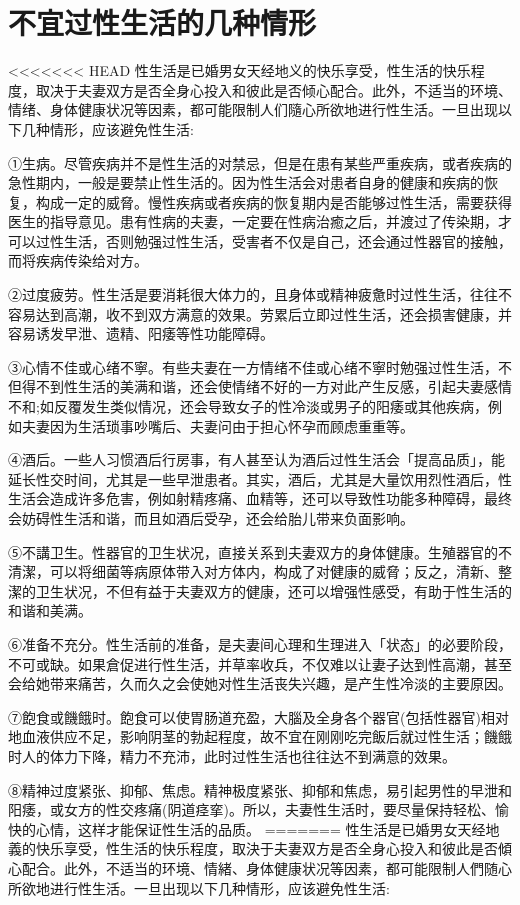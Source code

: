 \documentclass[12pt,UTF8]{ctexbook}
\begin{document}
\section{不宜过性生活的几种情形}

<<<<<<< HEAD
性生活是已婚男女天经地义的快乐享受，性生活的快乐程度，取决于夫妻双方是否全身心投入和彼此是否倾心配合。此外，不适当的环境、情绪、身体健康状况等因素，都可能限制人们隨心所欲地进行性生活。一旦出现以下几种情形，应该避免性生活:

①生病。尽管疾病并不是性生活的对禁忌，但是在患有某些严重疾病，或者疾病的急性期内，一般是要禁止性生活的。因为性生活会对患者自身的健康和疾病的恢复，构成一定的威脅。慢性疾病或者疾病的恢复期内是否能够过性生活，需要获得医生的指导意见。患有性病的夫妻，一定要在性病治癒之后，并渡过了传染期，才可以过性生活，否则勉强过性生活，受害者不仅是自己，还会通过性器官的接触，而将疾病传染给对方。

②过度疲劳。性生活是要消耗很大体力的，且身体或精神疲惫时过性生活，往往不容易达到高潮，收不到双方满意的效果。劳累后立即过性生活，还会损害健康，并容易诱发早泄、遗精、阳痿等性功能障碍。

③心情不佳或心绪不寧。有些夫妻在一方情绪不佳或心绪不寧时勉强过性生活，不但得不到性生活的美满和谐，还会使情绪不好的一方对此产生反感，引起夫妻感情不和;如反覆发生类似情况，还会导致女子的性冷淡或男子的阳痿或其他疾病，例如夫妻因为生活琐事吵嘴后、夫妻问由于担心怀孕而顾虑重重等。

④酒后。一些人习惯酒后行房事，有人甚至认为酒后过性生活会「提高品质」，能延长性交时间，尤其是一些早泄患者。其实，酒后，尤其是大量饮用烈性酒后，性生活会造成许多危害，例如射精疼痛、血精等，还可以导致性功能多种障碍，最终会妨碍性生活和谐，而且如酒后受孕，还会给胎儿带来负面影响。

⑤不講卫生。性器官的卫生状况，直接关系到夫妻双方的身体健康。生殖器官的不清潔，可以将细菌等病原体带入对方体内，构成了对健康的威脅；反之，清新、整潔的卫生状况，不但有益于夫妻双方的健康，还可以增强性感受，有助于性生活的和谐和美满。

⑥准备不充分。性生活前的准备，是夫妻间心理和生理进入「状态」的必要阶段，不可或缺。如果倉促进行性生活，并草率收兵，不仅难以让妻子达到性高潮，甚至会给她带来痛苦，久而久之会使她对性生活丧失兴趣，是产生性冷淡的主要原因。

⑦飽食或饑餓时。飽食可以使胃肠道充盈，大腦及全身各个器官(包括性器官)相对地血液供应不足，影响阴茎的勃起程度，故不宜在刚刚吃完飯后就过性生活；饑餓时人的体力下降，精力不充沛，此时过性生活也往往达不到满意的效果。

⑧精神过度紧张、抑郁、焦虑。精神极度紧张、抑郁和焦虑，易引起男性的早泄和阳痿，或女方的性交疼痛(阴道痉挛)。所以，夫妻性生活时，要尽量保持轻松、愉快的心情，这样才能保证性生活的品质。
=======
性生活是已婚男女天经地義的快乐享受，性生活的快乐程度，取決于夫妻双方是否全身心投入和彼此是否傾心配合。此外，不适当的环境、情緒、身体健康状况等因素，都可能限制人們随心所欲地进行性生活。一旦出现以下几种情形，应该避免性生活:
\end{document}
